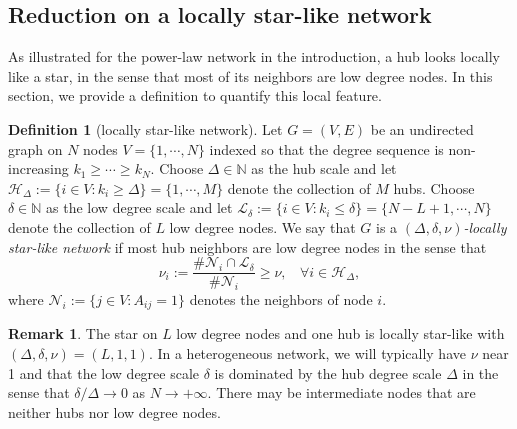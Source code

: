 \documentclass[a4paper]{article}
\theoremstyle{plain}
\theoremstyle{definition}
\newtheorem{defn}[theorem]{Definition}%
\newtheorem{rem}[theorem]{Remark}
\newcommand{\N}{\mathbb{N}}
\newcommand{\Hil}{\mathcal{H}}
\newcommand{\Lil}{\mathcal{L}}
\newcommand{\Nil}{\mathcal{N}}
\begin{document}
\subsection{Reduction on a locally star-like network}\label{sec:reduction_loc_star_like}
As illustrated for the power-law network in the introduction, a hub looks locally like a star, in the sense that most of its neighbors are low degree nodes. In this section, we provide a definition to quantify this local feature.
\begin{defn}[locally star-like network]
	Let $G=(V,E)$ be an undirected graph on $N$ nodes $V=\{1,\cdots,N\}$ indexed so that the degree sequence is non-increasing $k_1\geq \cdots\geq k_N$. 
	Choose $\Delta\in\N$ as the hub scale and let $\Hil_{\Delta}:=\{i\in V: k_i\geq \Delta\}=\{1,\cdots,M\}$ denote the collection of $M$ hubs. Choose $\delta\in\N$ as the low degree scale and let $\Lil_{\delta}:=\{i\in V: k_i\leq\delta\}=\{N-L+1,\cdots,N\}$ denote the collection of $L$ low degree nodes. We say that $G$ is a \textit{$(\Delta,\delta,\nu)$-locally star-like network} if most hub neighbors are low degree nodes in the sense that
	$$\nu_i:= \frac{\# \Nil_i\cap \Lil_{\delta}}{\#\Nil_i} \geq \nu,~~~~\forall i\in \Hil_{\Delta},$$
	where $\Nil_i:= \{j\in V: A_{ij}=1\}$ denotes the neighbors of node $i$.
\end{defn}

\begin{rem}
	The star on $L$ low degree nodes and one hub is locally star-like with $(\Delta,\delta,\nu)=(L,1,1)$. In a heterogeneous network, we will typically have $\nu$ near 1 and that the low degree scale $\delta$ is dominated by the hub degree scale $\Delta$ in the sense that $\delta/\Delta\to0$ as $N\to+\infty$. There may be intermediate nodes that are neither hubs nor low degree nodes.
\end{rem}
\end{document}

